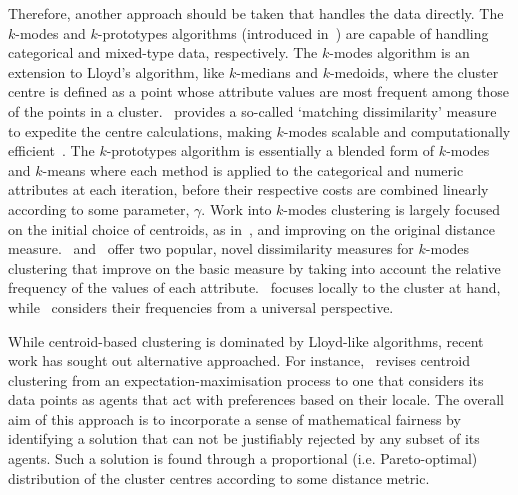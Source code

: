 Therefore, another approach should be taken that handles the data directly. The
\(k\)-modes and \(k\)-prototypes algorithms (introduced in~\cite{Huang1998}) are
capable of handling categorical and mixed-type data, respectively. The
\(k\)-modes algorithm is an extension to Lloyd's algorithm, like \(k\)-medians
and \(k\)-medoids, where the cluster centre is defined as a point whose
attribute values are most frequent among those of the points in a
cluster.~\cite{Huang1998} provides a so-called `matching dissimilarity' measure
to expedite the centre calculations, making \(k\)-modes scalable and
computationally efficient~\cite{Madhuri2014}. The \(k\)-prototypes algorithm is
essentially a blended form of \(k\)-modes and \(k\)-means where each method is
applied to the categorical and numeric attributes at each iteration, before
their respective costs are combined linearly according to some parameter,
\(\gamma\). Work into \(k\)-modes clustering is largely focused on the initial
choice of centroids, as
in~\cite{Cao2009,Jiang2016,Khan2013,Khan2007,Taoying2013}, and
improving on the original distance measure.~\cite{Cao2012} and~\cite{Ng2007}
offer two popular, novel dissimilarity measures for \(k\)-modes clustering that
improve on the basic measure by taking into account the relative frequency of
the values of each attribute.~\cite{Ng2007} focuses locally to the cluster at
hand, while~\cite{Cao2012} considers their frequencies from a universal
perspective.

While centroid-based clustering is dominated by Lloyd-like algorithms, recent
work has sought out alternative approached. For instance,~\cite{Chen2019}
revises centroid clustering from an expectation-maximisation process to one that
considers its data points as agents that act with preferences based on their
locale. The overall aim of this approach is to incorporate a sense of
mathematical fairness by identifying a solution that can not be justifiably
rejected by any subset of its agents. Such a solution is found through a
proportional (i.e. Pareto-optimal) distribution of the cluster centres according
to some distance metric.

